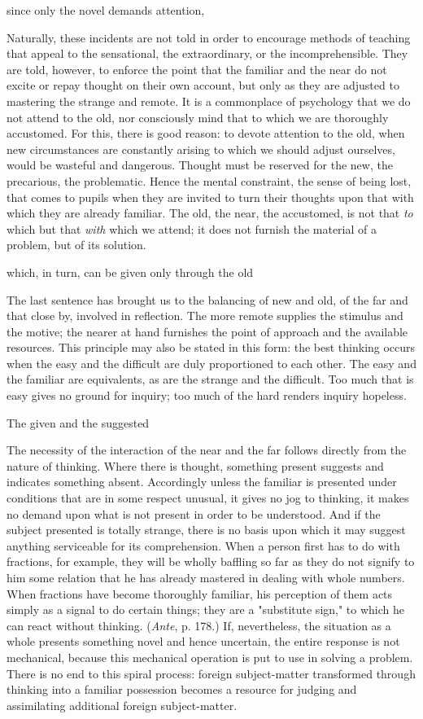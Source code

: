 \documentclass[letterpaper]{book}
\begin{document}
since only the novel demands attention,

Naturally, these incidents are not told in order to encourage methods of
teaching that appeal to the
sensational,
the extraordinary, or the incomprehensible. They are told, however, to
enforce the point that the familiar and the near do not excite or repay
thought on their own account, but only as they are adjusted to mastering
the strange and remote. It is a commonplace of psychology that we do not
attend to the old, nor consciously mind that to which we are thoroughly
accustomed. For this, there is good reason: to devote attention to the
old, when new circumstances are constantly arising to which we should
adjust ourselves, would be wasteful and dangerous. Thought must be
reserved for the new, the precarious, the problematic. Hence the mental
constraint, the sense of being lost, that comes to pupils when they are
invited to turn their thoughts upon that with which they are already
familiar. The old, the near, the accustomed, is not that \emph{to} which
but that \emph{with} which we attend; it does not furnish the material
of a problem, but of its solution.

which, in turn, can be given only through the old

The last sentence has brought us to the balancing of new and old, of the
far and that close by, involved in reflection. The more remote supplies
the stimulus and the motive; the nearer at hand furnishes the point of
approach and the available resources. This principle may also be stated
in this form: the best thinking occurs when the easy and the difficult
are duly proportioned to each other. The easy and the familiar are
equivalents, as are the strange and the difficult. Too much that is easy
gives no ground for inquiry; too much of the hard renders inquiry
hopeless.

The given and the suggested

The necessity of the interaction of the near and the far follows
directly from the nature of thinking. Where there is thought, something
present suggests and indicates something absent. Accordingly unless the
familiar
is presented under conditions that are in some respect unusual, it gives
no jog to thinking, it makes no demand upon what is not present in order
to be understood. And if the subject presented is totally strange, there
is no basis upon which it may suggest anything serviceable for its
comprehension. When a person first has to do with fractions, for
example, they will be wholly baffling so far as they do not signify to
him some relation that he has already mastered in dealing with whole
numbers. When fractions have become thoroughly familiar, his perception
of them acts simply as a signal to do certain things; they are a
"substitute sign," to which he can react without thinking. (\emph{Ante},
p. 178.) If, nevertheless, the situation as a whole presents something
novel and hence uncertain, the entire response is not mechanical,
because this mechanical operation is put to use in solving a problem.
There is no end to this spiral process: foreign subject-matter
transformed through thinking into a familiar possession becomes a
resource for judging and assimilating additional foreign subject-matter.
\end{document}
